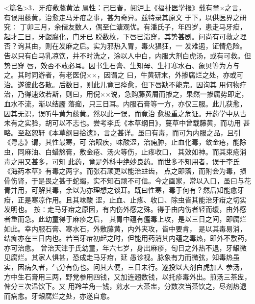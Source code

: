 \documentclass[a4paper,12pt,UTF8,twoside]{ctexbook}
\begin{document}
<篇名>3．牙疳敷藤黄法
属性：己巳春，阅沪上《福祉医学报》载有章×之言，有误用藤黄，治愈走马牙疳之事，甚为奇异。兹特录其原文 
于下，以供医界之研究∶ 
丁卯三月，余偕友数人，偶至仁溏观优。有潘氏子，年四岁，患走马牙疳，起才三日，牙龈腐化，门牙已 
脱数枚，下唇已溃穿，其势甚剧。问尚有可救之理否？询其由，则在发麻之后。实为邪热入胃，毒火猖狂，一 
发难遏，证情危险。告以只有白马乳凉饮，并不时洗之，涂以人中白，内服大剂白虎汤，或有可救。但势已穿 
唇，效否不敢必耳。因书生石膏、生知母、生打寒水石、象贝等为方与之。其时同游者，有老医倪××，因谓之 
曰，牛黄研末，外掺腐烂之处，亦或可治。遂彼此各散。后数日，则此儿竟已痊愈，但下唇缺不能完。因询其 
用何物疗治，乃得速效若斯，则曰，用倪××说，急购藤黄屑而掺之，果然一掺腐势即定，血水不流，渐以结靥 
落痂，只三日耳。内服石膏等一方，亦仅三服。此儿获愈，因其无识，误听牛黄为藤黄。然以此一误，而竟治 
愈极重之危证。开药学中从古未有之实验，胡可以不志也。尝考李氏《本草纲目》，蔓草中曾载藤黄，而功用 
甚略。至赵恕轩《本草纲目拾遗》，言之甚详。虽曰有毒，而可为内服之品，且引《粤志》谓，其性最寒，可 
治眼疾，味酸涩，治痈肿，止血化毒，敛金疮，能除虫，同麻油、白蜡熬膏，敷金疮、汤火等伤，止疼收口， 
其效如神。而其束疮消毒之用又甚多，可知 
此药，竟是外科中绝妙良药。而世多不知用者，误于李氏《海药本草》有毒之两字。而张石顽更以能治蛀齿， 
点之即落，而附会为毒，损骨伤肾，于是畏之甚于蛇蝎，实不知石顽不可信。今之画家，常以入口，虽曰与花 
青并用，可解其毒，余以为亦理想之谈耳。既曰性寒，毒于何有？然后知能愈牙疳，正是寒凉作用。且其味酸 
涩，止血、止疼、收口、除虫皆其能治牙疳之切实发明也。 
按∶走马牙疳之原因，有内伤外感之殊。得于由内伤者轻而缓，由外感者重而急。此幼童得于麻疹之后， 
其胃中蕴有瘟毒上攻，是以三日之间，即腐烂如此。幸内服石膏、寒水石，外敷藤黄，内外夹攻，皆中要肯， 
是以其毒易消，结痂亦在三日内也。若当牙疳初起之时，但能用药消其内蕴之毒热，即外不敷药，亦可治愈。 
曾治天津于氏幼童，年六七岁，身出麻疹，旬日之外热不退，牙龈微见腐烂。其家人惧甚，恐成走马牙疳，延 
愚诊视。脉象有力而微弦，知毒热虽实，因病久者，气分有伤也。问其大便，三日未行。遂投以大剂白虎加人 
参汤，方中生石膏用三两，野党参用四钱，又加连翘数钱，以托疹毒外出。煎汤三茶盅，俾分三次温饮下。又 
用羚羊角一钱，煎水一大茶盅，分数次当茶饮之，尽剂热退而病愈。牙龈腐烂之处，亦遂自愈。 
\end{document}
